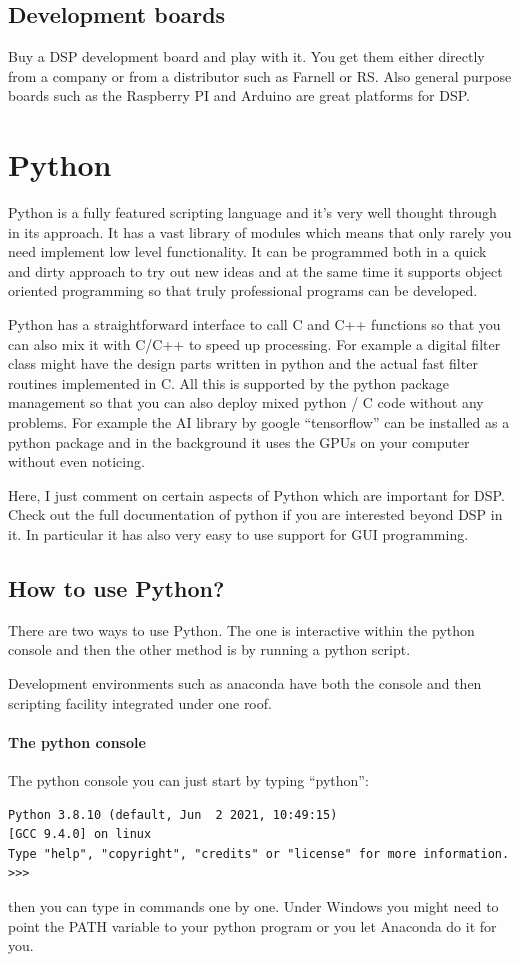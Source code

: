 \documentclass[12pt,a4paper]{article}
\begin{document}
\subsection{Development boards}
Buy a DSP development board and play with it. You get them either
directly from a company or from a distributor such as Farnell or RS.
Also general purpose boards such as the Raspberry PI and Arduino are great
platforms for DSP.

\section{Python}
Python is a fully featured scripting language and it's very well
thought through in its approach. It has a vast library of modules
which means that only rarely you need implement low level
functionality. It can be programmed both in a quick and dirty approach
to try out new ideas and at the same time it supports object oriented
programming so that truly professional programs can be
developed.

Python has a straightforward interface to call C and C++ functions so
that you can also mix it with C/C++ to speed up processing. For
example a digital filter class might have the design parts written in python
and the actual fast filter routines implemented in C. All this is
supported by the python package management so that you can also deploy
mixed python / C code without any problems. For example the AI library by
google ``tensorflow'' can be installed as a python package and in the
background it uses the GPUs on your computer without even noticing.

Here, I just comment on certain aspects of Python which are
important for DSP. Check out the full documentation of python
if you are interested beyond DSP in it. In particular it has
also very easy to use support for GUI programming.

\subsection{How to use Python?}
There are two ways to use Python. The one is interactive within
the python console and then the other method is by running
a python script.

Development environments such as anaconda have both the
console and then scripting facility integrated under one
roof.

\paragraph{The python console}
The python console you can just start by typing
``python'':
\begin{verbatim}
Python 3.8.10 (default, Jun  2 2021, 10:49:15) 
[GCC 9.4.0] on linux
Type "help", "copyright", "credits" or "license" for more information.
>>> 
\end{verbatim}
then you can type in commands one by one. Under Windows you might
need to point the PATH variable to your python program or you let Anaconda
do it for you.
\end{document}
